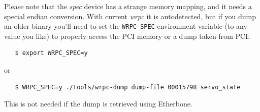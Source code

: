 \documentclass[a4paper, 12pt]{article}
\begin{document}
Please note that the \textit{spec} device has a strange memory mapping, and
it needs a special endian conversion. With current \textit{wrpc} it is
autodetected, but if you dump an older binary you'll need to set the
\texttt{WRPC\_SPEC} environment variable (to any value you like) to properly
access the PCI memory or a dump taken from PCI:
\begin{lstlisting}
   $ export WRPC_SPEC=y
\end{lstlisting}
or
\begin{lstlisting}
   $ WRPC_SPEC=y ./tools/wrpc-dump dump-file 00015798 servo_state
\end{lstlisting}
This is not needed if the dump is retrieved using Etherbone.

\end{document}
